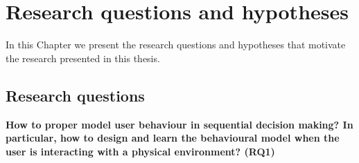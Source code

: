 \chapter{Research questions and hypotheses}

\ifpdf
    \graphicspath{{Chapter3/Figs/Raster/}{Chapter3/Figs/PDF/}{Chapter3/Figs/}}
\else
    \graphicspath{{Chapter3/Figs/Vector/}{Chapter3/Figs/}}
\fi

In this Chapter we present the research questions and hypotheses that motivate the research presented in this thesis.

\section{Research questions}


	\noindent\textbf{How to proper model user behaviour in sequential decision making? In particular, how to design and learn the behavioural model when the user is interacting with a physical environment? (RQ1)}
	
